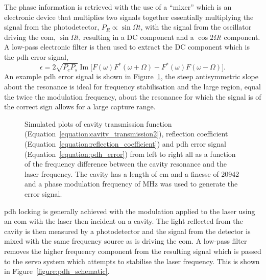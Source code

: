 The phase information is retrieved with the use of a ``mixer'' which is an electronic device that multiplies two signals together essentially multiplying the signal from the photodetector, $P_R \propto \sin\Omega t$, with the signal from the oscillator driving the \gls{eom}, $\sin\Omega t$, resulting in a DC component and a $\cos2\Omega t$ component.
A low-pass electronic filter is then used to extract the DC component which is the \gls{pdh} error signal,
\begin{equation}\label{equation:pdh_error}
\epsilon = 2\sqrt{P_cP_s}\operatorname{Im}\Bigg[F(\omega)F^*(\omega+\Omega) - F^*(\omega)F(\omega-\Omega)\Bigg].
\end{equation}
An example \gls{pdh} error signal is shown in Figure~\ref{figure:pdh_plots}, the steep antisymmetric slope about the resonance is ideal for frequency stabilisation and the large region, equal the twice the modulation frequency, about the resonance for which the signal is of the correct sign allows for a large capture range. 

\begin{figure}
\centering

\caption[Simulated cavity transmission and reflection, and \gls{pdh} error spectra.]{Simulated plots of cavity transmission function (Equation~\ref{equation:cavity_transmission2}), reflection coefficient (Equation~\ref{equation:reflection_coefficient}) and \gls{pdh} error signal (Equation~\ref{equation:pdh_error}) from left to right all as a function of the frequency difference between the cavity resonance and the laser frequency.
The cavity has a length of \unit[10]{cm} and a finesse of 20942 and a phase modulation frequency of \unit[2]{MHz} was used to generate the error signal.}
\label{figure:pdh_plots}
\end{figure}

\Gls{pdh} locking is generally achieved with the modulation applied to the laser using an \gls{eom} with the laser then incident on a cavity.
The light reflected from the cavity is then measured by a photodetector and the signal from the detector is mixed with the same frequency source as is driving the \gls{eom}.
A low-pass filter removes the higher frequency component from the resulting signal which is passed to the servo system which attempts to stabilise the laser frequency.
This is shown in Figure~\ref{figure:pdh_schematic}.

